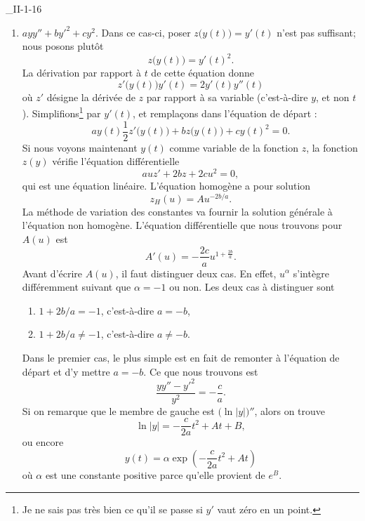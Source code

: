 \begin{corrige}{_II-1-16}
\begin{enumerate}
\item
$ayy''+by'^2+cy^2$.
Dans ce cas-ci, poser $z\big( y(t) \big)=y'(t)$ n'est pas suffisant; nous posons plutôt
\begin{equation}
	z\big( y(t) \big)=y'(t)^2.
\end{equation}
La dérivation par rapport à $t$ de cette équation donne
\begin{equation}		\label{EqDerrtChII116}
	z'\big( y(t) \big)y'(t)=2y'(t)y''(t)
\end{equation}
où $z'$ désigne la dérivée de $z$ par rapport à sa variable (c'est-à-dire $y$, et non $t$). Simplifions\footnote{Je ne sais pas très bien ce qu'il se passe si $y'$ vaut zéro en un point.} par $y'(t)$, et remplaçons dans l'équation de départ :
\begin{equation}
	ay(t)\frac{1 }{2}z'\big( y(t) \big)+bz\big( y(t) \big)+cy(t)^2=0.
\end{equation}
Si nous voyons maintenant $y(t)$ comme variable de la fonction $z$, la fonction $z(y)$ vérifie l'équation différentielle
\begin{equation}
	auz'+2bz+2cu^2=0,
\end{equation}
qui est une équation linéaire. L'équation homogène a pour solution
\begin{equation}
	z_H(u)=Au^{-2b/a}.
\end{equation}
La méthode de variation des constantes va fournir la solution générale à l'équation non homogène. L'équation différentielle que nous trouvons pour $A(u)$ est
\begin{equation}		\label{EqPourAVarCtII116}
	A'(u)=-\frac{ 2c }{ a }u^{1+\frac{ 2b }{ a }}.
\end{equation}
Avant d'écrire $A(u)$, il faut distinguer deux cas. En effet, $u^{\alpha}$ s'intègre différemment suivant que $\alpha=-1$ ou non. Les deux cas à distinguer sont
\begin{enumerate}
\item $1+2b/a=-1$, c'est-à-dire $a=-b$,
\item $1+2b/a\neq -1$, c'est-à-dire $a\neq -b$.
\end{enumerate}
Dans le premier cas, le plus simple est en fait de remonter à l'équation de départ et d'y mettre $a=-b$. Ce que nous trouvons est
\begin{equation}
	\frac{ yy''-y'^2 }{ y^2 }=-\frac{ c }{ a }.
\end{equation}
Si on remarque que le membre de gauche est $\big( \ln| y | \big)''$, alors on trouve
\begin{equation}
	\ln| y |=-\frac{ c }{ 2a }t^2+At+B,
\end{equation}
ou encore
\begin{equation}
	y(t)=\alpha  \exp\left( -\frac{ c }{ 2a }t^2+At \right)
\end{equation}
où $\alpha$ est une constante positive parce qu'elle provient de $ e^{B}$.


\end{enumerate}
\end{corrige}
